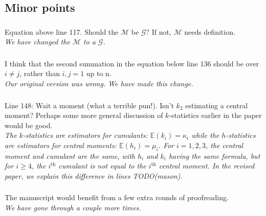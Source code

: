 \documentclass[11pt]{amsart}
\begin{document}
\subsection*{Minor points}
\subsubsection{}
Equation above line 117. Should the
$\mathcal{M}$ be $\mathcal{G}?$ If not, $\mathcal{M}$ needs definition.\\
\textit{
	We have changed the $\mathcal{M}$ to a $\mathcal{G}$.
}

\subsubsection{}
I think that the second summation in the equation below line 136 should be over
$i\neq j$, rather than $i,j = 1$ up to n.\\
\textit{
	Our original version was wrong. We have made this change.
}

\subsubsection{}
Line 148: Wait a moment (what a terrible pun!). Isn't $k_2$ estimating a central
moment? Perhaps some more general discussion of $k$-statistics earlier in the
paper would be good. \\
\textit{
	The $k$-statistics are estimators for cumulants: $\mathbb{E}(k_i) = \kappa_i$
	while the $h$-statistics are estimators for central moments: $\mathbb{E}(h_i)
	= \mu_i$. For $i=1,2,3$, the central moment and cumulant are the same, with
	$h_i$ and $k_i$ having the same formula, but for $i\geq 4$, the $i^\text{th}$
	cumulant is not equal to the $i^\text{th}$ central moment. In the revised
	paper, we explain this difference in lines TODO(mason).
}

\subsubsection{} The manuscript would benefit from a few extra rounds of
proofreading.\\
\textit{
	We have gone through a couple more times.
}
\end{document}
